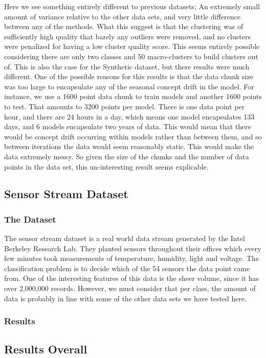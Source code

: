 \documentclass[12pt,a4paper,oneside]{report}
\begin{document}
Here we see something entirely different to previous datasets; An extremely small amount of variance relative to the other data sets, and very little difference between any of the methods. What this suggest is that the clustering was of sufficiently high quality that barely any outliers were removed, and no clusters were penalized for having a low cluster quality score. This seems entirely possible considering there are only two classes and 50 macro-clusters to build clusters out of. This is also the case for the Synthetic dataset, but there results were much different. One of the possible reasons for this results is that the data chunk size was too large to encapsulate any of the seasonal concept drift in the model. For instance, we use a 1600 point data chunk to train models and another 1600 points to test. That amounts to 3200 points per model. There is one data point per hour, and there are 24 hours in a day,  which means one model encapsulates 133 days, and 6 models encapsulate two years of data. This would mean that there would be concept drift occurring within models rather than between them, and so between iterations the data would seem reasonably static. This would make the data extremely messy. So given the size of the chunks and the number of data points in the data set, this un-interesting result seems explicable. 
\subsection*{Sensor Stream Dataset}
\subsubsection*{The Dataset}
The sensor stream dataset is a real world data stream generated by the Intel Berkeley Research Lab. They planted sensors throughout their offices which every few minutes took measurements of temperature, humidity, light and voltage. The classification problem is to decide which of the 54 sensors the data point came from. One of the interesting features of this data is the sheer volume, since it has over 2,000,000 records. However, we must consider that per class, the amount of data is probably in line with some of the other data sets we have tested here.  

\subsubsection*{Results}

\subsection*{Results Overall}
\end{document}
